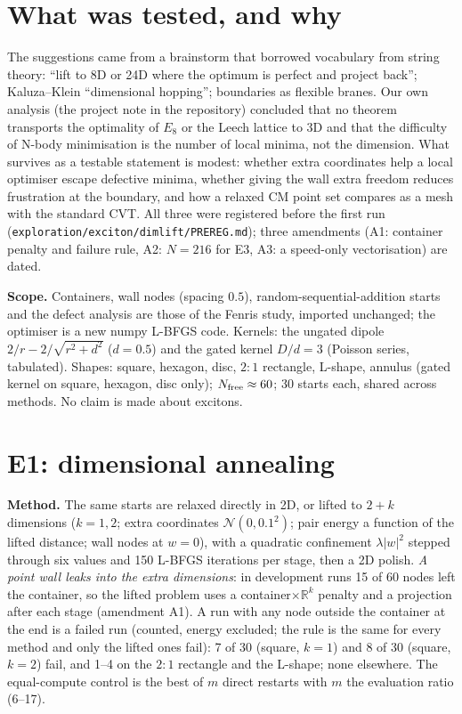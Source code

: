 \documentclass[11pt,a4paper]{article}
\begin{document}
\section{What was tested, and why}

The suggestions came from a brainstorm that borrowed vocabulary from string theory: ``lift to 8D or 24D where the optimum is
perfect and project back''; Kaluza--Klein ``dimensional hopping''; boundaries as flexible branes. Our own analysis (the project
note in the repository) concluded that no theorem transports the optimality of $E_8$ or the Leech lattice to 3D and that the
difficulty of N-body minimisation is the number of local minima, not the dimension. What survives as a testable statement is
modest: whether extra coordinates help a local optimiser escape defective minima, whether giving the wall extra freedom reduces
frustration at the boundary, and how a relaxed CM point set compares as a mesh with the standard CVT. All three were registered
before the first run (\texttt{exploration/exciton/dimlift/PREREG.md}); three amendments (A1: container penalty and failure rule,
A2: $N=216$ for E3, A3: a speed-only vectorisation) are dated.

\begin{keybox}
\textbf{Scope.} Containers, wall nodes (spacing $0.5$), random-sequential-addition starts and the defect analysis are those of the
Fenris study, imported unchanged; the optimiser is a new numpy L-BFGS code. Kernels: the ungated dipole $2/r-2/\sqrt{r^2+d^2}$
($d=0.5$) and the gated kernel $D/d=3$ (Poisson series, tabulated). Shapes: square, hexagon, disc, $2{:}1$ rectangle, L-shape, annulus
(gated kernel on square, hexagon, disc only); $N_{\rm free}\approx60$; 30 starts each, shared across methods. No claim is made
about excitons.
\end{keybox}

\section{E1: dimensional annealing}

\textbf{Method.} The same starts are relaxed directly in 2D, or lifted to $2+k$ dimensions ($k=1,2$; extra coordinates
$\mathcal N(0,0.1^2)$; pair energy a function of the lifted distance; wall nodes at $w=0$), with a quadratic confinement
$\lambda|w|^2$ stepped through six values and 150 L-BFGS iterations per stage, then a 2D polish. \emph{A point wall leaks into the
extra dimensions}: in development runs 15 of 60 nodes left the container, so the lifted problem uses a container$\times\mathbb R^k$
penalty and a projection after each stage (amendment A1). A run with any node outside the container at the end is a failed run
(counted, energy excluded; the rule is the same for every method and only the lifted ones fail): 7 of 30 (square, $k=1$) and 8 of 30 (square, $k=2$) fail, and 1--4 on the $2{:}1$ rectangle and the L-shape; none elsewhere.
The equal-compute control is the best of $m$ direct restarts with $m$ the evaluation ratio (6--17).
\end{document}
